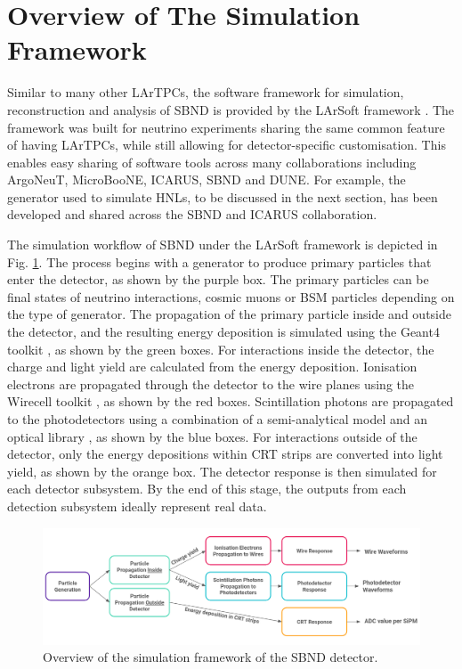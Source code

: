 \section{Overview of The Simulation Framework}
\label{sec:overview_sim}

Similar to many other LArTPCs, the software framework for simulation, reconstruction and analysis of SBND is provided by the LArSoft framework \cite{larsoft}. 
The framework was built for neutrino experiments sharing the same common feature of having LArTPCs, while still allowing for detector-specific customisation. 
This enables easy sharing of software tools across many collaborations including ArgoNeuT, MicroBooNE, ICARUS, SBND and DUNE. 
For example, the generator used to simulate HNLs, to be discussed in the next section, has been developed and shared across the SBND and ICARUS collaboration.

The simulation workflow of SBND under the LArSoft framework is depicted in Fig. \ref{fig:Sim_Workflow}.
The process begins with a generator to produce primary particles that enter the detector, as shown by the purple box.
The primary particles can be final states of neutrino interactions, cosmic muons or BSM particles depending on the type of generator.
The propagation of the primary particle inside and outside the detector, and the resulting energy deposition is simulated using the Geant4 toolkit \cite{geant4}, as shown by the green boxes.
For interactions inside the detector, the charge and light yield are calculated from the energy deposition.
Ionisation electrons are propagated through the detector to the wire planes using the Wirecell toolkit \cite{wirecell}, as shown by the red boxes.
Scintillation photons are propagated to the photodetectors using a combination of a semi-analytical model and an optical library \cite{sbnd_pds_paper}, as shown by the blue boxes.
For interactions outside of the detector, only the energy depositions within CRT strips are converted into light yield, as shown by the orange box.
The detector response is then simulated for each detector subsystem.
By the end of this stage, the outputs from each detection subsystem ideally represent real data.

\begin{figure}[htbp!] 
\centering    
\includegraphics[width=1.0\textwidth]{Sim_Workflow}
\caption[Simulation Framework of SBND]{
Overview of the simulation framework of the SBND detector.
}
\label{fig:Sim_Workflow}
\end{figure}

